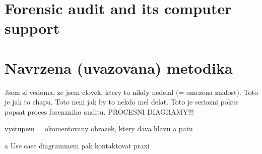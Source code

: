 \newcommand{\komentar}[1]{{\leavevmode\color[rgb]{1.0, 0.13, 0.32}#1}}
\newcommand{\sediva}[1]{{\leavevmode\color[rgb]{0.5, 0.5, 0.5}#1}}

\setcounter{chapter}{0}
\setcounter{section}{1}
 


\sediva{ \blindtext}
\sediva{ \blindtext}

\chapter*{Forensic audit and its computer support}



\chapter*{Navrzena (uvazovana) metodika}
\komentar{Jsem si vedoma, ze jsem clovek, ktery to nikdy nedelal (= omezena znalost).
Toto je jak to chapu. Toto neni jak by to nekdo mel delat. Toto je seriozni pokus popsat proces forenzniho auditu.
PROCESNI DIAGRAMY!!!

vystupem = okomentovany obrazek, ktery dava hlavu a patu

a Use case diagrammem pak kontaktovat praxi

}





%
%
% 


